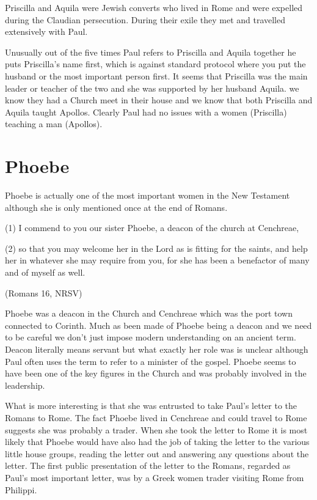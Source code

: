 \documentclass[a5paper, openany, oneside, pagesize,
headings=standardclasses, chapterprefix=false]{scrbook}
\begin{document}
Priscilla and Aquila were Jewish converts who lived in Rome and were
expelled during the Claudian persecution. During their exile they met
and travelled extensively with Paul. 

Unusually out of the five times Paul refers to Priscilla and Aquila
together he puts Priscilla's name first, which is against standard
protocol where you put the husband or the most important person first.
It seems that Priscilla was the main leader or teacher of the two and she was
supported by her husband Aquila. we know they had a Church meet in
their house and we know that both Priscilla and Aquila taught Apollos.
Clearly Paul had no issues with a women (Priscilla) teaching a man (Apollos). 


\section{Phoebe}

Phoebe is actually one of the most important women in the New
Testament although she is only mentioned once at the end of Romans.

\begin{myquote}

(1) I commend to you our sister Phoebe, a deacon of the church at
Cenchreae,

(2) so that you may welcome her in the Lord as is fitting for the saints, and help her in whatever she may require from you, for she has been a benefactor of many and of myself as well.

(Romans 16, NRSV)
\end{myquote}

Phoebe was a deacon in the Church and Cenchreae which was the port town
connected to Corinth. Much as been made of Phoebe being a deacon and
we need to be careful we don't just impose modern understanding on an
ancient term. Deacon literally means servant but what exactly her role was is
unclear although Paul often uses the term to refer to a minister of
the gospel. Phoebe seems to have been one of the key figures in the
Church and was probably involved in the leadership.

What is more
interesting is that she was entrusted to take Paul's letter to the
Romans to Rome. The fact Phoebe lived in Cenchreae and could travel to
Rome suggests she was probably a trader. When she took the letter to
Rome it is most likely that Phoebe would have also had the job of
taking the letter to the various little house groups, reading the
letter out and answering any questions about the letter. The first
public presentation of the letter to the Romans, regarded as Paul's
most important letter, was by a
Greek women trader visiting Rome from Philippi.
\end{document}
